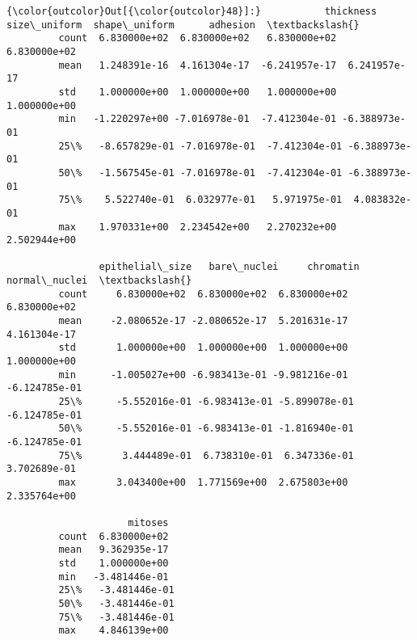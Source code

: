 \documentclass[11pt]{article}
\begin{document}
\begin{Verbatim}[commandchars=\\\{\}]
{\color{outcolor}Out[{\color{outcolor}48}]:}           thickness  size\_uniform  shape\_uniform      adhesion  \textbackslash{}
         count  6.830000e+02  6.830000e+02   6.830000e+02  6.830000e+02   
         mean   1.248391e-16  4.161304e-17  -6.241957e-17  6.241957e-17   
         std    1.000000e+00  1.000000e+00   1.000000e+00  1.000000e+00   
         min   -1.220297e+00 -7.016978e-01  -7.412304e-01 -6.388973e-01   
         25\%   -8.657829e-01 -7.016978e-01  -7.412304e-01 -6.388973e-01   
         50\%   -1.567545e-01 -7.016978e-01  -7.412304e-01 -6.388973e-01   
         75\%    5.522740e-01  6.032977e-01   5.971975e-01  4.083832e-01   
         max    1.970331e+00  2.234542e+00   2.270232e+00  2.502944e+00   
         
                epithelial\_size   bare\_nuclei     chromatin  normal\_nuclei  \textbackslash{}
         count     6.830000e+02  6.830000e+02  6.830000e+02   6.830000e+02   
         mean     -2.080652e-17 -2.080652e-17  5.201631e-17   4.161304e-17   
         std       1.000000e+00  1.000000e+00  1.000000e+00   1.000000e+00   
         min      -1.005027e+00 -6.983413e-01 -9.981216e-01  -6.124785e-01   
         25\%      -5.552016e-01 -6.983413e-01 -5.899078e-01  -6.124785e-01   
         50\%      -5.552016e-01 -6.983413e-01 -1.816940e-01  -6.124785e-01   
         75\%       3.444489e-01  6.738310e-01  6.347336e-01   3.702689e-01   
         max       3.043400e+00  1.771569e+00  2.675803e+00   2.335764e+00   
         
                     mitoses  
         count  6.830000e+02  
         mean   9.362935e-17  
         std    1.000000e+00  
         min   -3.481446e-01  
         25\%   -3.481446e-01  
         50\%   -3.481446e-01  
         75\%   -3.481446e-01  
         max    4.846139e+00  
\end{Verbatim}
            
\end{document}
